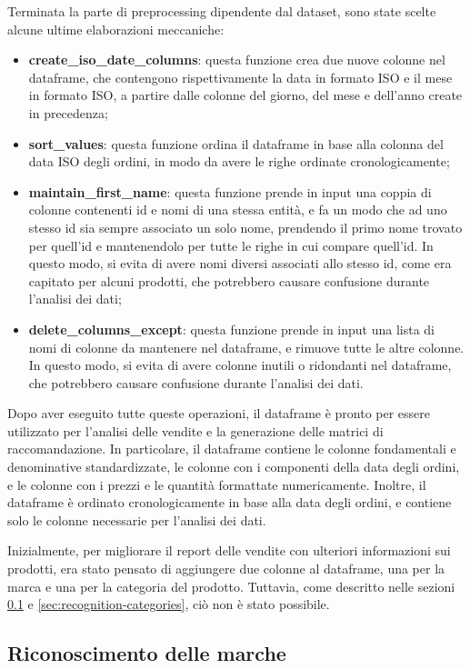 Terminata la parte di preprocessing dipendente dal dataset, sono state scelte alcune ultime elaborazioni meccaniche:
\begin{itemize}
    \item \textbf{create\_iso\_date\_columns}: questa funzione crea due nuove colonne nel dataframe, che contengono rispettivamente la data in formato ISO e il mese in formato ISO, a partire dalle colonne del giorno, del mese e dell'anno create in precedenza;
    \item \textbf{sort\_values}: questa funzione ordina il dataframe in base alla colonna del data ISO degli ordini, in modo da avere le righe ordinate cronologicamente;
    \item \textbf{maintain\_first\_name}: questa funzione prende in input una coppia di colonne contenenti id e nomi di una stessa entità, e fa un modo che ad uno stesso id sia sempre associato un solo nome, prendendo il primo nome trovato per quell'id e mantenendolo per tutte le righe in cui compare quell'id. In questo modo, si evita di avere nomi diversi associati allo stesso id, come era capitato per alcuni prodotti, che potrebbero causare confusione durante l'analisi dei dati;
    \item \textbf{delete\_columns\_except}: questa funzione prende in input una lista di nomi di colonne da mantenere nel dataframe, e rimuove tutte le altre colonne. In questo modo, si evita di avere colonne inutili o ridondanti nel dataframe, che potrebbero causare confusione durante l'analisi dei dati.
\end{itemize}

Dopo aver eseguito tutte queste operazioni, il dataframe è pronto per essere utilizzato per l'analisi delle vendite e la generazione delle matrici di raccomandazione. In particolare, il dataframe contiene le colonne fondamentali e denominative standardizzate, le colonne con i componenti della data degli ordini, e le colonne con i prezzi e le quantità formattate numericamente. Inoltre, il dataframe è ordinato cronologicamente in base alla data degli ordini, e contiene solo le colonne necessarie per l'analisi dei dati.

Inizialmente, per migliorare il report delle vendite con ulteriori informazioni sui prodotti, era stato pensato di aggiungere due colonne al dataframe, una per la marca e una per la categoria del prodotto. Tuttavia, come descritto nelle sezioni \ref{sec:recognition-brands} e \ref{sec:recognition-categories}, ciò non è stato possibile.


\subsection{Riconoscimento delle marche}
\label{sec:recognition-brands}

